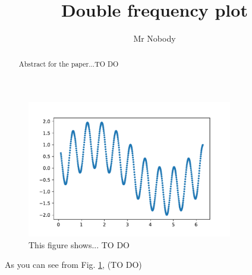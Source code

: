 \documentclass{article}
\title{Double frequency plot}
\author{Mr Nobody}
\begin{document}
\maketitle

\begin{abstract}
Abstract for the paper...TO DO
\end{abstract}

\begin{figure}[h]
\begin{center}
\includegraphics[width=0.8\textwidth]{"../plots/wave"}
\end{center}
\caption{This figure shows... TO DO}
\label{fig:wave}
\end{figure}

As you can see from Fig. \ref{fig:wave}, (TO DO)
\end{document}
